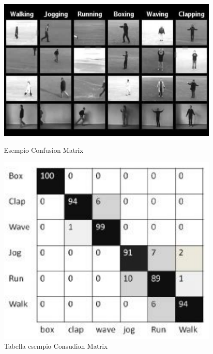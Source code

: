 	\begin{figure}
		\centering
		\begin{minipage}{.5\textwidth}
			\centering
			\includegraphics[width=1\linewidth]{imgs/chapter6/img5}
			\caption{Esempio Confusion Matrix}
			\label{fig:chapter06-05}
		\end{minipage}%
		\begin{minipage}{.5\textwidth}
			\centering
			\includegraphics[width=1\linewidth]{imgs/chapter6/img6}
			\caption{Tabella esempio Consudion Matrix}
			\label{fig:chapter06-06}
		\end{minipage}
	\end{figure}
	
